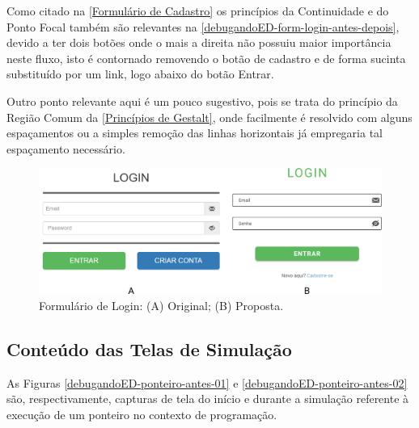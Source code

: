 Como citado na \autoref{Formulário de Cadastro} os princípios da Continuidade e do Ponto Focal também são relevantes na \autoref{debugandoED-form-login-antes-depois}, devido a ter dois botões onde o mais a direita não possuiu maior importância neste fluxo, isto é contornado removendo o botão de cadastro e de forma sucinta substituído por um link, logo abaixo do botão Entrar.

Outro ponto relevante aqui é um pouco sugestivo, pois se trata do princípio da Região Comum da \autoref{Princípios de Gestalt}, onde facilmente é resolvido com alguns espaçamentos ou a simples remoção das linhas horizontais já empregaria tal espaçamento necessário.

\begin{figure}[htb]
    \begin{center}
	    \includegraphics[scale=0.35]{figs/debugandoED-form-login-antes-depois.png}
	\end{center}
    \caption{\label{debugandoED-form-login-antes-depois}Formulário de Login: (A) Original; (B) Proposta.}
\end{figure}

\subsection{Conteúdo das Telas de Simulação}
\label{Conteúdo das Telas de Simulação}

As Figuras \ref{debugandoED-ponteiro-antes-01} e \ref{debugandoED-ponteiro-antes-02} são, respectivamente, capturas de tela do início e durante a simulação referente à execução de um ponteiro no contexto de programação.

